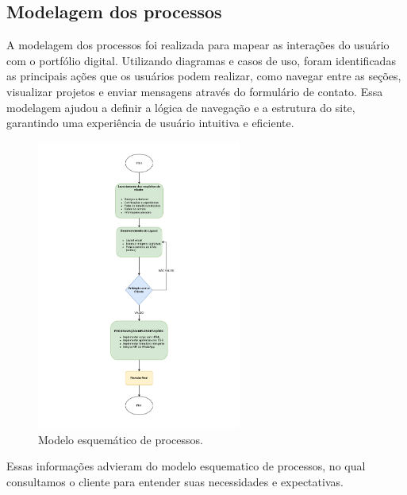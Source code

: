 \subsection{Modelagem dos processos}

A modelagem dos processos foi realizada para mapear as interações do usuário com o portfólio digital. Utilizando diagramas e casos de uso, foram identificadas as principais ações que os usuários podem realizar, como navegar entre as seções, visualizar projetos e enviar mensagens através do formulário de contato. Essa modelagem ajudou a definir a lógica de navegação e a estrutura do site, garantindo uma experiência de usuário intuitiva e eficiente.

\begin{figure}[H]
    \centering
    \includegraphics[width=0.6\textwidth]{Figures/modelo_esquematico_de_processos..pdf} %
    \caption{Modelo esquemático de processos.}
    \label{fig:esquema}
\end{figure}

Essas informações advieram do modelo esquematico de processos, no qual consultamos o cliente para entender suas necessidades e expectativas.




